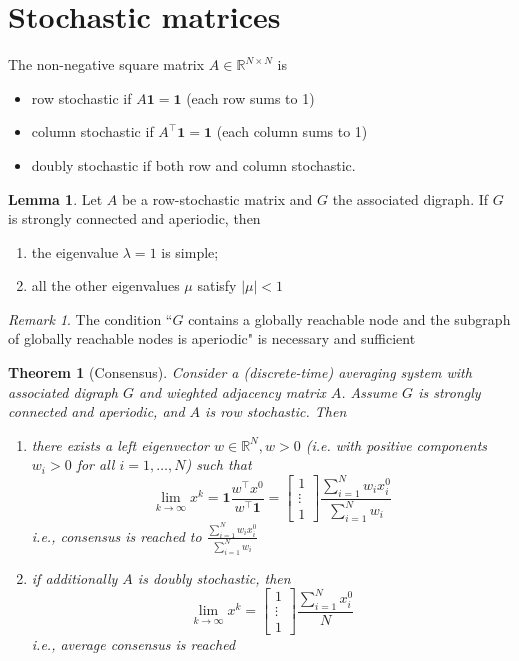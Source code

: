 \documentclass{book}
\newcommand{\R}{\mathbb{R}}
\theoremstyle{theoremv2}
\newtheorem{theorem}{Theorem}[chapter]
\theoremstyle{defv2}
\theoremstyle{remark}
\newtheorem*{remark}{Remark}
\theoremstyle{remark}
\theoremstyle{definition}
\newtheorem*{lemma}{Lemma}
\theoremstyle{definition}
\begin{document}
\section{Stochastic matrices}
The non-negative square matrix $A\in\R^{N\times N}$ is 
\begin{itemize}
    \item row stochastic if $A\mathbf{1}=\mathbf{1}$ (each row sums to 1)
    \item column stochastic if $A^\top \mathbf{1}=\mathbf{1}$ (each column sums to 1)
    \item doubly stochastic if both row and column stochastic.
\end{itemize}
\begin{lemma}
    Let $A$ be a row-stochastic matrix and $G$ the associated digraph. If $G$ is strongly connected and aperiodic, then 
    \begin{enumerate}
        \item the eigenvalue $\lambda=1$ is simple; 
        \item all the other eigenvalues $\mu$ satisfy $|\mu|<1$
    \end{enumerate}
\end{lemma}
\begin{remark}
    The condition ``$G$ contains a globally reachable node and the subgraph of globally reachable nodes is aperiodic" is necessary and sufficient
\end{remark}
\begin{theorem}[Consensus]
    Consider a (discrete-time) averaging system with associated digraph $G$ and wieghted adjacency matrix $A$. Assume $G$ is strongly connected and aperiodic, and $A$ is row stochastic. Then 
    \begin{enumerate}
        \item there exists a left eigenvector $w\in\R^N,w>0$ (i.e. with positive components $w_i>0$ for all $i=1,\dots,N$) such that 
            \[
                \lim_{k\to\infty}x^k = \mathbf{1}\displaystyle\frac{w^\top x^0}{w^\top \mathbf{1}} = \begin{bmatrix}
                    1 \\ \vdots \\ 1
                \end{bmatrix} \displaystyle\frac{\sum_{i=1}^{N}w_ix_i^0}{\sum_{i=1}^{N}w_i}
            \]
            i.e., consensus is reached to $ \displaystyle\frac{\sum_{i=1}^{N}w_ix_i^0}{\sum_{i=1}^{N}w_i}$
        \item if additionally $A$ is doubly stochastic, then 
            \[
                \lim_{k\to\infty}x^k = \begin{bmatrix}
                    1 \\ \vdots \\ 1
                \end{bmatrix} \displaystyle\frac{\sum_{i=1}^{N}x_i^0}{N}
            \]
            i.e., average consensus is reached
    \end{enumerate}
\end{theorem}
\end{document}

